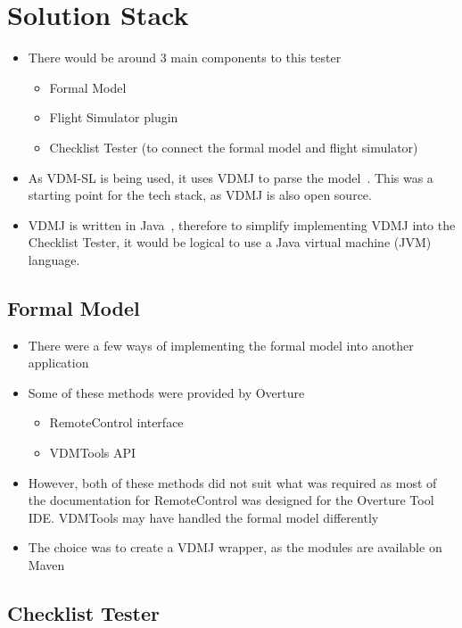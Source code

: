 \documentclass[../dissertation.tex]{subfiles}
\begin{document}
\section{Solution Stack}
\begin{itemize}
  \item There would be around 3 main components to this tester
    \begin{itemize}
      \item Formal Model
      \item Flight Simulator plugin
      \item Checklist Tester (to connect the formal model and flight simulator)
    \end{itemize}
  \item As VDM-SL is being used, it uses VDMJ to parse the model~\cite{vdmj}. This was a starting
    point for the tech stack, as VDMJ is also open source.
  \item VDMJ is written in Java~\cite{vdmj}, therefore to simplify implementing VDMJ into the
    Checklist Tester, it would be logical to use a Java virtual machine (JVM) language.
\end{itemize}

\subsection{Formal Model}
\begin{itemize}
  \item There were a few ways of implementing the formal model into another application
  \item Some of these methods were provided by Overture~\cite{overture-remote}
    \begin{itemize}
      \item RemoteControl interface
      \item VDMTools API~\cite{vdmtoolbox-api}
    \end{itemize}
  \item However, both of these methods did not suit what was required as most of the
    documentation for RemoteControl was designed for the Overture Tool IDE. VDMTools
    may have handled the formal model differently
  \item The choice was to create a VDMJ wrapper, as the modules are available on Maven
\end{itemize}

\subsection{Checklist Tester}
\end{document}
